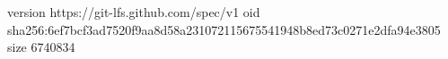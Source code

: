 version https://git-lfs.github.com/spec/v1
oid sha256:6ef7bcf3ad7520f9aa8d58a231072115675541948b8ed73c0271e2dfa94e3805
size 6740834
